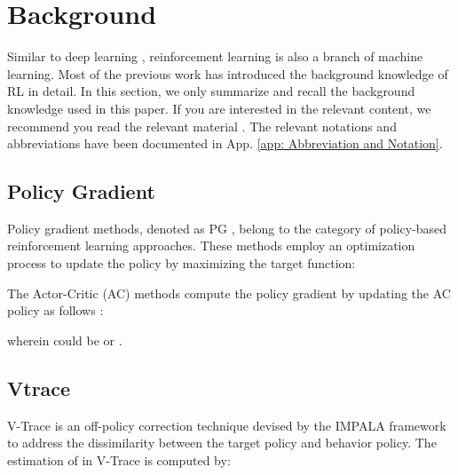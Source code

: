 



































\clearpage
\section{Background}
\label{app: background on RL}


Similar to deep learning \citep{cl,actionr,6d,dclsr,wang2023dr,wang2022lhnn}, reinforcement learning is also a branch of machine learning.  Most of the previous work has introduced the background knowledge of RL in detail. In this section, we only summarize and recall the background knowledge used in this paper. If you are interested in the relevant content, we recommend you read the relevant material \citep{pi2,sutton}. The relevant notations and abbreviations have been documented in App. \ref{app: Abbreviation and Notation}.


\subsection{Policy Gradient}
\label{app: pg}

Policy gradient methods, denoted as PG \citep{williams1992simple,casa,entropy}, belong to the category of policy-based reinforcement learning approaches. These methods employ an optimization process to update the policy by maximizing the target function:



The Actor-Critic (AC) methods compute the policy gradient by updating the AC policy as follows \citep{sutton}:

wherein  could be   or . 

\subsection{Vtrace}
\label{app: vtrace}
V-Trace is an off-policy correction technique devised by the IMPALA framework \citep{impala} to address the dissimilarity between the target policy and behavior policy. The estimation of  in V-Trace is computed by:

